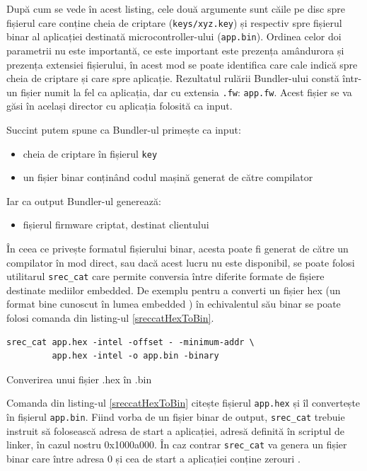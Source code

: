 \documentclass[12pt,a4paper,titlepage]{report}
\begin{document}
După cum se vede în acest listing, cele două argumente sunt căile pe disc spre fișierul care conține cheia de criptare (\texttt{keys/xyz.key}) și respectiv spre fișierul binar al aplicației destinată microcontroller-ului (\texttt{app.bin}). Ordinea celor doi parametrii nu este importantă, ce este important este prezența amândurora și prezența extensiei fișierului, în acest mod se poate identifica care cale indică spre cheia de criptare și care spre aplicație. Rezultatul rulării Bundler-ului constă într-un fișier numit la fel ca aplicația, dar cu extensia \texttt{.fw}: \texttt{app.fw}. Acest fișier se va găsi în același director cu aplicația folosită ca input.

Succint putem spune ca Bundler-ul primește ca input:
\begin{itemize}
\item cheia de criptare în fișierul \texttt{key}
\item un fișier binar conținând codul mașină generat de către compilator
\end{itemize}

Iar ca output Bundler-ul generează:
\begin{itemize}
\item fișierul firmware criptat, destinat clientului
\end{itemize}

În ceea ce privește formatul fișierului binar, acesta poate fi generat de către un compilator în mod direct, sau dacă acest lucru nu este disponibil, se poate folosi utilitarul \texttt{srec\_cat} care permite conversia între diferite formate de fișiere destinate mediilor embedded.
De exemplu pentru a converti un fișier hex (un format bine cunoscut în lumea embedded \cite{hexFormat}) în echivalentul său binar se poate folosi comanda din listing-ul \ref{sreccatHexToBin}.

\begin{listing}[h]
\begin{verbatim}
srec_cat app.hex -intel -offset - -minimum-addr \
         app.hex -intel -o app.bin -binary
\end{verbatim}

\caption{Converirea unui fișier .hex în .bin}
\label{sreccatHexToBin}
\end{listing}

Comanda din listing-ul \ref{sreccatHexToBin} citește fișierul \texttt{app.hex} și îl convertește în fișierul \texttt{app.bin}. Fiind vorba de un fișier binar de output, \texttt{srec\_cat} trebuie instruit să folosească adresa de start a aplicației, adresă definită în scriptul de linker, în cazul nostru 0x1000a000. În caz contrar \texttt{srec\_cat} va genera un fișier binar care între adresa 0 și cea de start a aplicației conține zerouri \cite{srecExamples}.
\end{document}
